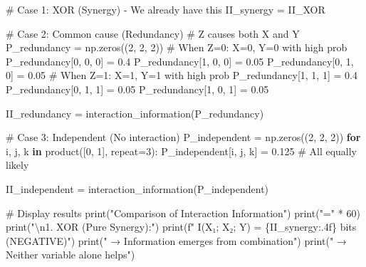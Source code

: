 \documentclass[
  11pt,
  letterpaper,
  oneside,
  openany]{book}
\newenvironment{Shaded}{\begin{snugshade}}{\end{snugshade}}
\newcommand{\BuiltInTok}[1]{\textcolor[rgb]{0.00,0.23,0.31}{#1}}
\newcommand{\CharTok}[1]{\textcolor[rgb]{0.13,0.47,0.30}{#1}}
\newcommand{\CommentTok}[1]{\textcolor[rgb]{0.37,0.37,0.37}{#1}}
\newcommand{\ControlFlowTok}[1]{\textcolor[rgb]{0.00,0.23,0.31}{\textbf{#1}}}
\newcommand{\DecValTok}[1]{\textcolor[rgb]{0.68,0.00,0.00}{#1}}
\newcommand{\FloatTok}[1]{\textcolor[rgb]{0.68,0.00,0.00}{#1}}
\newcommand{\KeywordTok}[1]{\textcolor[rgb]{0.00,0.23,0.31}{\textbf{#1}}}
\newcommand{\NormalTok}[1]{\textcolor[rgb]{0.00,0.23,0.31}{#1}}
\newcommand{\OperatorTok}[1]{\textcolor[rgb]{0.37,0.37,0.37}{#1}}
\newcommand{\SpecialCharTok}[1]{\textcolor[rgb]{0.37,0.37,0.37}{#1}}
\newcommand{\SpecialStringTok}[1]{\textcolor[rgb]{0.13,0.47,0.30}{#1}}
\newcommand{\StringTok}[1]{\textcolor[rgb]{0.13,0.47,0.30}{#1}}
\begin{document}
\begin{Shaded}
\begin{Highlighting}[]
\CommentTok{\# Case 1: XOR (Synergy) {-} We already have this}
\NormalTok{II\_synergy }\OperatorTok{=}\NormalTok{ II\_XOR}

\CommentTok{\# Case 2: Common cause (Redundancy)}
\CommentTok{\# Z causes both X and Y}
\NormalTok{P\_redundancy }\OperatorTok{=}\NormalTok{ np.zeros((}\DecValTok{2}\NormalTok{, }\DecValTok{2}\NormalTok{, }\DecValTok{2}\NormalTok{))}
\CommentTok{\# When Z=0: X=0, Y=0 with high prob}
\NormalTok{P\_redundancy[}\DecValTok{0}\NormalTok{, }\DecValTok{0}\NormalTok{, }\DecValTok{0}\NormalTok{] }\OperatorTok{=} \FloatTok{0.4}
\NormalTok{P\_redundancy[}\DecValTok{1}\NormalTok{, }\DecValTok{0}\NormalTok{, }\DecValTok{0}\NormalTok{] }\OperatorTok{=} \FloatTok{0.05}
\NormalTok{P\_redundancy[}\DecValTok{0}\NormalTok{, }\DecValTok{1}\NormalTok{, }\DecValTok{0}\NormalTok{] }\OperatorTok{=} \FloatTok{0.05}
\CommentTok{\# When Z=1: X=1, Y=1 with high prob  }
\NormalTok{P\_redundancy[}\DecValTok{1}\NormalTok{, }\DecValTok{1}\NormalTok{, }\DecValTok{1}\NormalTok{] }\OperatorTok{=} \FloatTok{0.4}
\NormalTok{P\_redundancy[}\DecValTok{0}\NormalTok{, }\DecValTok{1}\NormalTok{, }\DecValTok{1}\NormalTok{] }\OperatorTok{=} \FloatTok{0.05}
\NormalTok{P\_redundancy[}\DecValTok{1}\NormalTok{, }\DecValTok{0}\NormalTok{, }\DecValTok{1}\NormalTok{] }\OperatorTok{=} \FloatTok{0.05}

\NormalTok{II\_redundancy }\OperatorTok{=}\NormalTok{ interaction\_information(P\_redundancy)}

\CommentTok{\# Case 3: Independent (No interaction)}
\NormalTok{P\_independent }\OperatorTok{=}\NormalTok{ np.zeros((}\DecValTok{2}\NormalTok{, }\DecValTok{2}\NormalTok{, }\DecValTok{2}\NormalTok{))}
\ControlFlowTok{for}\NormalTok{ i, j, k }\KeywordTok{in}\NormalTok{ product([}\DecValTok{0}\NormalTok{, }\DecValTok{1}\NormalTok{], repeat}\OperatorTok{=}\DecValTok{3}\NormalTok{):}
\NormalTok{    P\_independent[i, j, k] }\OperatorTok{=} \FloatTok{0.125}  \CommentTok{\# All equally likely}

\NormalTok{II\_independent }\OperatorTok{=}\NormalTok{ interaction\_information(P\_independent)}

\CommentTok{\# Display results}
\BuiltInTok{print}\NormalTok{(}\StringTok{"Comparison of Interaction Information"}\NormalTok{)}
\BuiltInTok{print}\NormalTok{(}\StringTok{"="} \OperatorTok{*} \DecValTok{60}\NormalTok{)}
\BuiltInTok{print}\NormalTok{(}\StringTok{"}\CharTok{\textbackslash{}n}\StringTok{1. XOR (Pure Synergy):"}\NormalTok{)}
\BuiltInTok{print}\NormalTok{(}\SpecialStringTok{f"   I(X₁; X₂; Y) = }\SpecialCharTok{\{}\NormalTok{II\_synergy}\SpecialCharTok{:.4f\}}\SpecialStringTok{ bits (NEGATIVE)"}\NormalTok{)}
\BuiltInTok{print}\NormalTok{(}\StringTok{"   → Information emerges from combination"}\NormalTok{)}
\BuiltInTok{print}\NormalTok{(}\StringTok{"   → Neither variable alone helps"}\NormalTok{)}


\end{Highlighting}
\end{Shaded}
\end{document}

